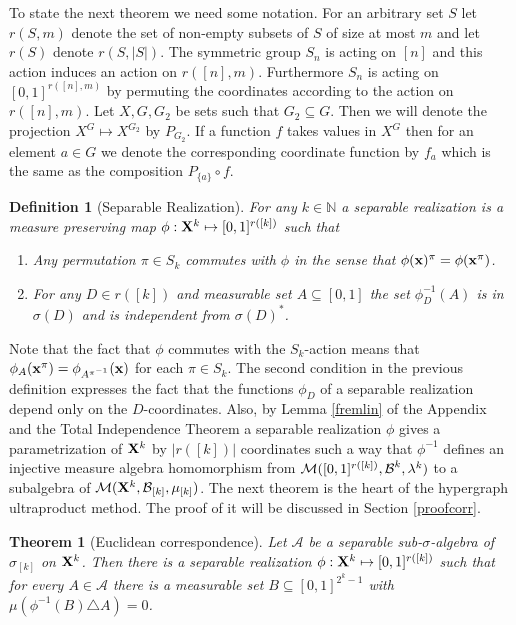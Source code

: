 \documentclass [11pt] {article}
\newtheorem{theorem}{Theorem}
\newtheorem{definition}{Definition}[section]
\def\cB{\mbox{$\cal B$}}
\def\cB{\mbox{$\cal B$}}
\def\cM{\mbox{$\cal M$}}
\def\xo{{\bf X}}
\def\bbx{{\bf x}}
\begin{document}
To state the next theorem we need some notation.
 For an arbitrary set $S$ let $r(S,m)$
denote the set of non-empty subsets of $S$ of size at most $m$ and let $r(S)$
denote $r(S,|S|)$. The symmetric group $S_n$ is acting on $[n]$
and this action induces an action on $r([n],m)$. Furthermore $S_n$ is acting
on $[0,1]^{r([n],m)}$ by permuting the coordinates according to the action on
$r([n],m)$. Let $X,G,G_2$ be sets such that $G_2\subseteq G$. Then
we will denote the projection $X^{G}\mapsto X^{G_2}$ by $P_{G_2}$. If a
function $f$ takes values in $X^{G}$ then for an element $a\in G$ we denote
the corresponding coordinate function by $f_a$ which is the same as the
composition $P_{\{a\}}\circ f$.

\begin{definition}[Separable Realization]\label{desepre} For any
  $k\in\mathbb{N}$ a separable realization is a measure preserving map
$\phi:{\bf X}^k\mapsto [0,1]^{r([k])}$ such that

\begin{enumerate}
\item Any permutation $\pi\in S_k$ commutes with $\phi$ in the
sense that $\phi(\bbx)^\pi=\phi(\bbx^\pi)$.

\item For any $D\in r([k])$ and measurable set $A\subseteq [0,1]$
the set $\phi_D^{-1}(A)$
is in $\sigma(D)$ and is independent from $\sigma(D)^*$.
\end{enumerate}

\end{definition}

\smallskip

\noindent
Note that the fact that $\phi$ commutes with the $S_k$-action means that
$\phi_A(\bbx^\pi)=\phi_{A^{\pi^{-1}}}(\bbx)$ for each $\pi\in S_k$.
The second condition in the previous definition expresses the fact
that the functions $\phi_D$ of a separable realization
depend only on the $D$-coordinates. Also, by Lemma \ref{fremlin}
of the Appendix and the Total Independence Theorem
a separable realization $\phi$ gives a parametrization of $\xo^k$
by $|r([k])|$ coordinates such a way that
$\phi^{-1}$ defines an injective measure algebra homomorphism
from $\cM([0,1]^{r([k])},\cB^k,\lambda^k)$ to a subalgebra of
$\cM(\xo^k,\cB_{[k]},\mu_{[k]})$.
The next theorem is the heart of the hypergraph ultraproduct method.
The proof of it will be discussed in Section \ref{proofcorr}.

\begin{theorem}[Euclidean correspondence]\label{eucc} Let $\mathcal{A}$ be a
  separable sub-$\sigma$-algebra of $\sigma_{[k]}$ on ${\bf X}^k$.
Then there is a separable realization $\phi:{\bf X}^k\mapsto [0,1]^{r([k])}$
such that for every $A\in\mathcal{A}$ there is a measurable set
$B\subseteq[0,1]^{2^k-1}$ with $\mu(\phi^{-1}(B)\triangle A)=0$.
\end{theorem}
\end{document}
